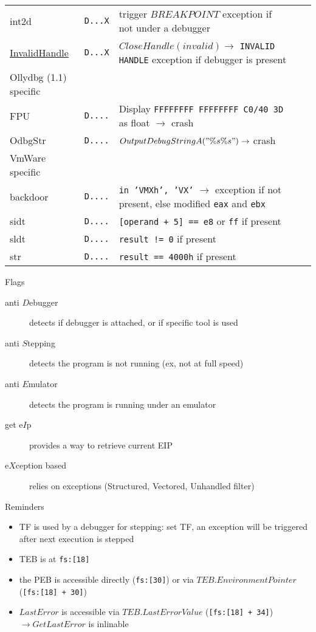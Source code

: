 \begin{tabular}{lllll}
{int2d}			& {\tt D...X} & trigger $BREAKPOINT$ exception if not under a debugger\\
\href{http://corkami.blogspot.com/2010/02/and-when-i-start-to-come-undone-stitch.html}
{InvalidHandle}		& {\tt D...X} & $CloseHandle(invalid) \rightarrow$ {\tt INVALID HANDLE} exception if debugger is present\\
\midrule
Ollydbg (1.1) specific \\
\midrule
FPU				& {\tt D....} & Display {\tt FFFFFFFF FFFFFFFF C0/40 3D} as float $\rightarrow$ crash \\
OdbgStr			& {\tt D....} & $OutputDebugStringA("\%s\%s") \rightarrow$ crash \\ 
\midrule
VmWare specific \\
\midrule
backdoor			& {\tt D....} & {\tt in 'VMXh', 'VX'} $\rightarrow$ exception if not present, else modified {\tt eax} and {\tt ebx} \\
sidt				& {\tt D....} & {\tt [operand + 5] == e8} or {\tt ff} if present \\
sldt				& {\tt D....} & {\tt result != 0} if present \\
str				& {\tt D....} & {\tt result == 4000h} if present \\
\bottomrule
\end{tabular}

\sig

\newpage

Flags
\begin{description}
\item[anti $D$ebugger]
detects if debugger is attached, or if specific tool is used
\item[anti $S$tepping]
detects the program is not running (ex, not at full speed)
\item[anti $E$mulator]
detects the program is running under an emulator
\item[get e$I$p]
provides a way to retrieve current EIP
\item[e$X$ception based]
relies on exceptions (Structured, Vectored, Unhandled filter)
\end{description}


Reminders
\begin{itemize}
\item
TF is used by a debugger for stepping: set TF, an exception will be triggered after next execution is stepped
\item
TEB is at {\tt fs:[18]}
\item
the PEB is accessible directly ({\tt fs:[30]}) or via $TEB.EnvironmentPointer$ ({\tt [fs:[18] + 30]})
\item
$LastError$ is accessible via $TEB.LastErrorValue$ ({\tt [fs:[18] + 34]}) $\rightarrow GetLastError$ is inlinable
\end{itemize}

\sig

